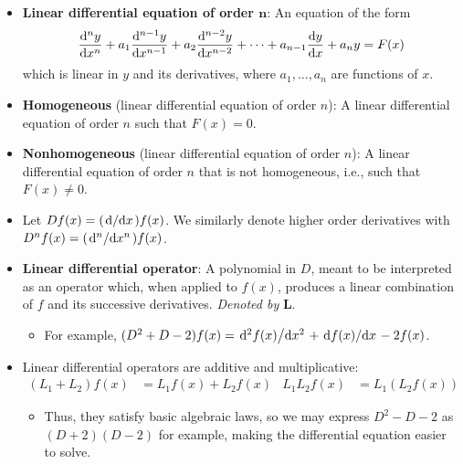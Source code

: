 \documentclass[../main.tex]{subfiles}
\begin{document}
\begin{itemize}
    \item \textbf{Linear differential equation of order $\bm{n}$}: An equation of the form
    \begin{equation*}
        \dv[n]{y}{x}+a_1\dv[n-1]{y}{x}+a_2\dv[n-2]{y}{x}+\cdots+a_{n-1}\dv{y}{x}+a_ny = F(x)
    \end{equation*}
    which is linear in $y$ and its derivatives, where $a_1,\dots,a_n$ are functions of $x$.
    \item \textbf{Homogeneous} (linear differential equation of order $n$): A linear differential equation of order $n$ such that $F(x)=0$.
    \item \textbf{Nonhomogeneous} (linear differential equation of order $n$): A linear differential equation of order $n$ that is not homogeneous, i.e., such that $F(x)\neq 0$.
    \item Let $Df(x)=(\dv*{x})f(x)$. We similarly denote higher order derivatives with $D^nf(x)=(\dv*[n]{x})f(x)$.
    \item \textbf{Linear differential operator}: A polynomial in $D$, meant to be interpreted as an operator which, when applied to $f(x)$, produces a linear combination of $f$ and its successive derivatives. \emph{Denoted by} $\bm{L}$.
    \begin{itemize}
        \item For example, $(D^2+D-2)f(x)=\dv*[2]{f(x)}{x}+\dv*{f(x)}{x}-2f(x)$.
    \end{itemize}
    \item Linear differential operators are additive and multiplicative:
    \begin{align*}
        (L_1+L_2)f(x) &= L_1f(x)+L_2f(x)&
        L_1L_2f(x) &= L_1(L_2f(x))
    \end{align*}
    \begin{itemize}
        \item Thus, they satisfy basic algebraic laws, so we may express $D^2-D-2$ as $(D+2)(D-2)$ for example, making the differential equation easier to solve.
    \end{itemize}
\end{itemize}
\end{document}
